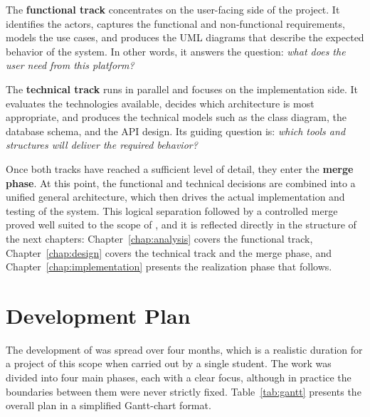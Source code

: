 The \textbf{functional track} concentrates on the user-facing side of the project. It identifies the actors, captures the functional and non-functional requirements, models the use cases, and produces the UML diagrams that describe the expected behavior of the system. In other words, it answers the question: \textit{what does the user need from this platform?}

The \textbf{technical track} runs in parallel and focuses on the implementation side. It evaluates the technologies available, decides which architecture is most appropriate, and produces the technical models such as the class diagram, the database schema, and the API design. Its guiding question is: \textit{which tools and structures will deliver the required behavior?}

Once both tracks have reached a sufficient level of detail, they enter the \textbf{merge phase}. At this point, the functional and technical decisions are combined into a unified general architecture, which then drives the actual implementation and testing of the system. This logical separation followed by a controlled merge proved well suited to the scope of \projectname{}, and it is reflected directly in the structure of the next chapters: Chapter~\ref{chap:analysis} covers the functional track, Chapter~\ref{chap:design} covers the technical track and the merge phase, and Chapter~\ref{chap:implementation} presents the realization phase that follows.

\section{Development Plan}

The development of \projectname{} was spread over four months, which is a realistic duration for a project of this scope when carried out by a single student. The work was divided into four main phases, each with a clear focus, although in practice the boundaries between them were never strictly fixed. Table~\ref{tab:gantt} presents the overall plan in a simplified Gantt-chart format.

